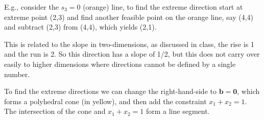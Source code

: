 \begin{center}   \end{center} 



\medskip E.g., consider the $s_3=0$ (orange) line, to find the extreme direction start at extreme point (2,3) and find another feasible point on the orange line, say (4,4) and subtract (2,3) from (4,4), which yields (2,1). 

\medskip This is related to the slope in two-dimensions, as discussed in class, the rise is 1 and the run is 2. So this direction has a slope of 1/2, but this does not carry over easily to higher dimensions where directions cannot be defined by a single number. 

\medskip To find the extreme directions we can change the right-hand-side to $\mathbf{b} = \mathbf{0}$, which forms a polyhedral cone (in yellow), and then add the constraint $x_1 + x_2 = 1$. The intersection of the cone and  $x_1 + x_2 = 1$ form a line segment.

